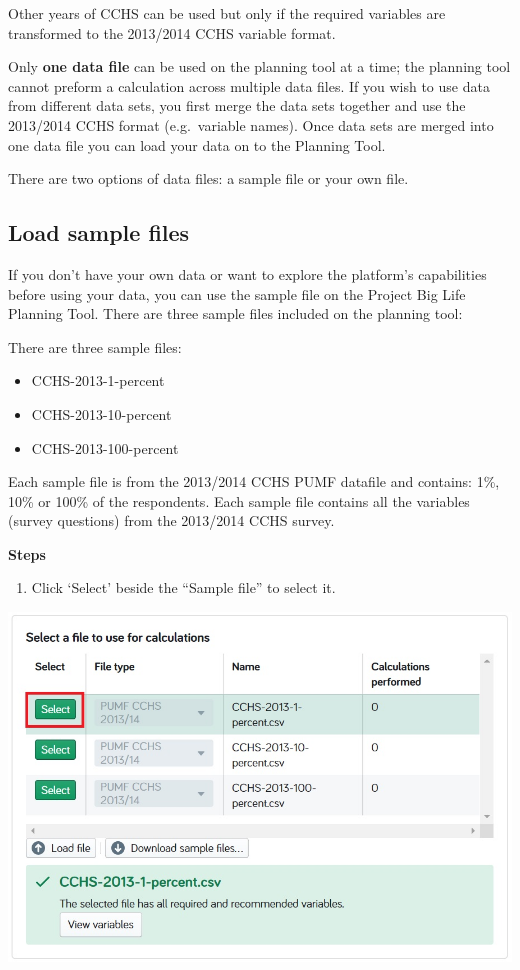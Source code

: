 \documentclass[]{book}
\providecommand{\tightlist}{%
  \setlength{\itemsep}{0pt}\setlength{\parskip}{0pt}}
\begin{document}
Other years of CCHS can be used but only if the required variables are
transformed to the 2013/2014 CCHS variable format.

Only \textbf{one data file} can be used on the planning tool at a time;
the planning tool cannot preform a calculation across multiple data
files. If you wish to use data from different data sets, you first merge
the data sets together and use the 2013/2014 CCHS format (e.g.~variable
names). Once data sets are merged into one data file you can load your
data on to the Planning Tool.

There are two options of data files: a sample file or your own file.

\subsection{Load sample files}\label{load-sample-files}

If you don't have your own data or want to explore the platform's
capabilities before using your data, you can use the sample file on the
Project Big Life Planning Tool. There are three sample files included on
the planning tool:

There are three sample files:

\begin{itemize}
\tightlist
\item
  CCHS-2013-1-percent
\item
  CCHS-2013-10-percent
\item
  CCHS-2013-100-percent
\end{itemize}

Each sample file is from the 2013/2014 CCHS PUMF datafile and contains:
1\%, 10\% or 100\% of the respondents. Each sample file contains all the
variables (survey questions) from the 2013/2014 CCHS survey.

\textbf{Steps}

\begin{enumerate}
\def\labelenumi{\arabic{enumi}.}
\tightlist
\item
  Click `Select' beside the ``Sample file'' to select it.
\end{enumerate}

\begin{center}\includegraphics{Images/Datafiles} \end{center}
\end{document}
